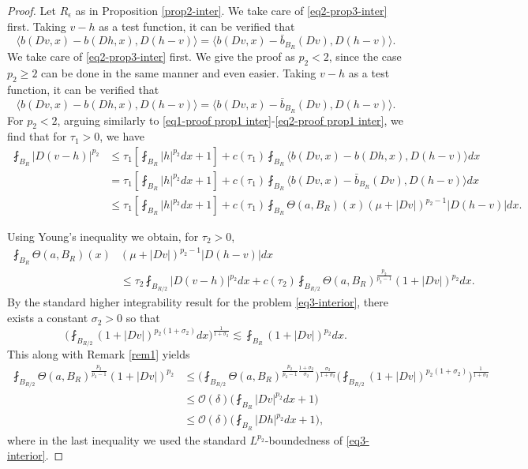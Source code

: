 \documentclass[a4paper,10pt]{amsart}
\newcommand{\lesi}{\lesssim}
\newcommand{\f}{\frac}
\begin{document}
\begin{proof}
	Let $R_\epsilon$ as in Proposition \eqref{prop2-inter}. We take care of \eqref{eq2-prop3-inter} first. Taking $v-h$ as a test function, it can be verified that
	$$
	\langle b(Dv,x)-b(Dh,x), D(h-v)\rangle=\langle b(Dv,x)-\bar{b}_{B_R}(Dv), D(h-v)\rangle.
	$$
	We take care of \eqref{eq2-prop3-inter} first. We give the proof as $p_2<2$, since the case $p_2\geq 2$ can be done in the same manner and even easier. Taking $v-h$ as a test function, it can be verified that
	$$
	\langle b(Dv,x)-b(Dh,x), D(h-v)\rangle=\langle b(Dv,x)-\bar{b}_{B_R}(Dv), D(h-v)\rangle.
	$$
	For $p_2<2$, arguing similarly to \eqref{eq1-proof prop1 inter}-\eqref{eq2-proof prop1 inter}, we find that for   $\tau_1>0$, we have
	$$
	\begin{aligned}
	\fint_{B_{R}}|D(v-h)|^{p_2}&\leq \tau_1\left[\fint_{B_R}|h|^{p_2} dx+1\right]+c(\tau_1)\fint_{B_{R}} \langle b(Dv,x)-b(Dh,x), D(h-v)\rangle dx\\
	&=\tau_1\left[\fint_{B_R}|h|^{p_2} dx+1\right]+c(\tau_1)\fint_{B_{R}}\langle b(Dv,x)-\bar{b}_{B_R}(Dv), D(h-v)\rangle dx\\
	&\leq \tau_1\left[\fint_{B_R}|h|^{p_2} dx+1\right]+c(\tau_1)\fint_{B_{R}}\Theta(a,B_R)(x)(\mu+|Dv|)^{p_2-1}|D(h-v)|dx.
	\end{aligned}
	$$
	
	Using Young's inequality we obtain, for $\tau_2>0$,
	$$
	\begin{aligned}
	\fint_{B_{R}}\Theta(a,B_R)(x)&(\mu+|Dv|)^{p_2-1}|D(h-v)|dx\\
	&\leq \tau_2\fint_{B_{R/2}}|D(v-h)|^{p_2}dx + c(\tau_2)\fint_{B_{R/2}}\Theta(a,B_R)^{\f{p_2}{p_2-1}}(1+|Dv|)^{p_2}dx.
	\end{aligned}
	$$
	By the standard higher integrability result for the problem \eqref{eq3-interior}, there exists a constant $\sigma_2>0$ so that
	$$
	\Big(\fint_{B_{R/2}}(1+|Dv|)^{p_2(1+\sigma_2)}dx\Big)^{\f{1}{1+\sigma_2}}\lesi \fint_{B_{R}}(1+|Dv|)^{p_2}dx.
	$$
	This along with Remark \ref{rem1} yields
	$$
	\begin{aligned}
	\fint_{B_{R/2}}\Theta(a,B_R)^{\f{p_2}{p_2-1}}(1+|Dv|)^{p_2}&\leq \Big(\fint_{B_{R/2}}\Theta(a,B_R)^{\f{p_2}{p_2-1}\f{1+\sigma_2}{\sigma_2}}\Big)^{\f{\sigma_2}{1+\sigma_2}}\Big(\fint_{B_{R/2}}(1+|Dv|)^{p_2(1+\sigma_2)}\Big)^{\f{1}{1+\sigma_2}}\\
	&\leq \mathcal{O}(\delta)\Big(\fint_{B_R}|Dv|^{p_2}dx +1\Big)\\
	&\leq \mathcal{O}(\delta)\Big(\fint_{B_R}|Dh|^{p_2}dx +1\Big),
	\end{aligned}
	$$
	where in the last inequality we used the standard $L^{p_2}$-boundedness of \eqref{eq3-interior}.
	

\end{proof}
\end{document}
